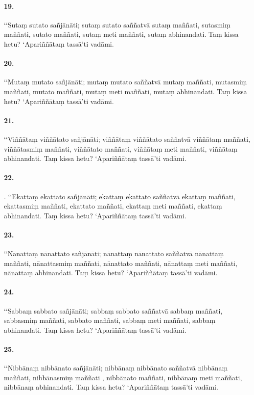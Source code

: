 \paragraph{19.} ‘‘Sutaṃ sutato sañjānāti; sutaṃ sutato saññatvā sutaṃ maññati, sutasmiṃ maññati, sutato maññati, sutaṃ meti maññati, sutaṃ abhinandati. Taṃ kissa hetu? ‘Apariññātaṃ tassā’ti vadāmi.

\paragraph{20.} ‘‘Mutaṃ mutato sañjānāti; mutaṃ mutato saññatvā mutaṃ maññati, mutasmiṃ maññati, mutato maññati, mutaṃ meti maññati, mutaṃ abhinandati. Taṃ kissa hetu? ‘Apariññātaṃ tassā’ti vadāmi.

\paragraph{21.} ‘‘Viññātaṃ viññātato sañjānāti; viññātaṃ viññātato saññatvā viññātaṃ maññati, viññātasmiṃ maññati, viññātato maññati, viññātaṃ meti maññati, viññātaṃ abhinandati. Taṃ kissa hetu? ‘Apariññātaṃ tassā’ti vadāmi.

\paragraph{22.} . ‘‘Ekattaṃ ekattato sañjānāti; ekattaṃ ekattato saññatvā ekattaṃ maññati, ekattasmiṃ maññati, ekattato maññati, ekattaṃ meti maññati, ekattaṃ abhinandati. Taṃ kissa hetu? ‘Apariññātaṃ tassā’ti vadāmi.

\paragraph{23.} ‘‘Nānattaṃ nānattato sañjānāti; nānattaṃ nānattato saññatvā nānattaṃ maññati, nānattasmiṃ maññati, nānattato maññati, nānattaṃ meti maññati, nānattaṃ abhinandati. Taṃ kissa hetu? ‘Apariññātaṃ tassā’ti vadāmi.

\paragraph{24.} ‘‘Sabbaṃ sabbato sañjānāti; sabbaṃ sabbato saññatvā sabbaṃ maññati, sabbasmiṃ maññati, sabbato maññati, sabbaṃ meti maññati, sabbaṃ abhinandati. Taṃ kissa hetu? ‘Apariññātaṃ tassā’ti vadāmi.

\paragraph{25.} ‘‘Nibbānaṃ nibbānato sañjānāti; nibbānaṃ nibbānato saññatvā nibbānaṃ maññati, nibbānasmiṃ maññati , nibbānato maññati, nibbānaṃ meti maññati, nibbānaṃ abhinandati. Taṃ kissa hetu? ‘Apariññātaṃ tassā’ti vadāmi.

